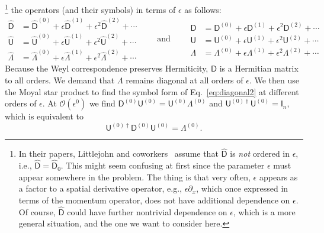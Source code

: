 \footnote{In their papers, Littlejohn and coworkers~\cite{littlejohn1991,weigert1993} assume that $\widehat{\mathsf{D}}$ is \emph{not} ordered in $\epsilon$, i.e., $\widehat{\mathsf{D}} = \widehat{\mathsf{D}}_{0}$.
  This might seem confusing at first since the parameter $\epsilon$ must appear somewhere in the problem.
  The thing is that very often, $\epsilon$ appears as a factor to a spatial derivative operator, e.g., $\epsilon\partial_{x}$, which once expressed in terms of the momentum operator, does not have additional dependence on $\epsilon$.
  Of course, $\widehat{\mathsf{D}}$ could have further nontrivial dependence on $\epsilon$, which is a more general situation, and the one we want to consider here.
}
the operators (and their symbols) in terms of $\epsilon$ as follows:
%
\begin{equation}
  \begin{aligned}
    \widehat{\mathsf{D}} &= \widehat{\mathsf{D}}^{(0)} + \epsilon\widehat{\mathsf{D}}^{(1)} + \epsilon^{2}\widehat{\mathsf{D}}^{(2)} + \cdots\\
    \widehat{\mathsf{U}} &= \widehat{\mathsf{U}}^{(0)} + \epsilon\widehat{\mathsf{U}}^{(1)} + \epsilon^{2}\widehat{\mathsf{U}}^{(2)} + \cdots\\
    \widehat{\Lambda} &= \widehat{\Lambda}^{(0)} + \epsilon\widehat{\Lambda}^{(1)} + \epsilon^{2}\widehat{\Lambda}^{(2)} + \cdots
  \end{aligned}
  \qquad\text{and}\qquad
  \begin{aligned}
    {\mathsf{D}} &= {\mathsf{D}}^{(0)} + \epsilon{\mathsf{D}}^{(1)} + \epsilon^{2}{\mathsf{D}}^{(2)} + \cdots\\
    {\mathsf{U}} &= {\mathsf{U}}^{(0)} + \epsilon{\mathsf{U}}^{(1)} + \epsilon^{2}{\mathsf{U}}^{(2)} + \cdots\\
    {\Lambda} &= {\Lambda}^{(0)} + \epsilon{\Lambda}^{(1)} + \epsilon^{2}{\Lambda}^{(2)} + \cdots
  \end{aligned}
\end{equation}
%
Because the Weyl correspondence preserves Hermiticity, $\mathsf{D}$ is a Hermitian matrix to all orders.
We demand that $\Lambda$ remains diagonal at all orders of $\epsilon$.
We then use the Moyal star product to find the symbol form of Eq.~\eqref{eq:diagonal2} at different orders of $\epsilon$.
At $\mathcal{O}(\epsilon^0)$ we find $\mathsf{D}^{(0)}\mathsf{U}^{(0)} = \mathsf{U}^{(0)}\Lambda^{(0)}$ and $\mathsf{U}^{(0)\dagger}\mathsf{U}^{(0)} = \mathsf{I}_{n}$, which is equivalent to
%
\begin{equation}
  \mathsf{U}^{(0)\dagger}\mathsf{D}^{(0)}\mathsf{U}^{(0)} = \Lambda^{(0)}.\label{eq:omega0}
\end{equation}
